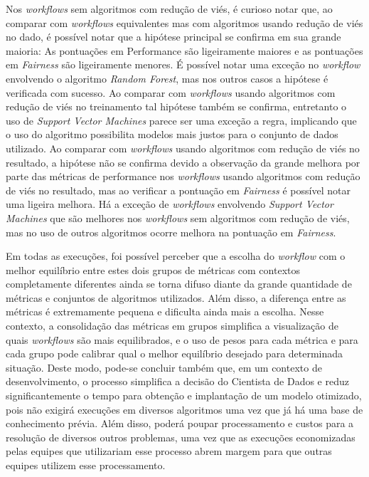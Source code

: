 \documentclass[twocolumn]{article}
\begin{document}
Nos \textit{workflows} sem algoritmos com redução de viés, é curioso notar que, ao comparar com \textit{workflows} equivalentes mas com algoritmos usando redução de viés no dado, é possível notar que a hipótese principal se confirma em sua grande maioria: As pontuações em Performance são ligeiramente maiores e as pontuações em \textit{Fairness} são ligeiramente menores. É possível notar uma exceção no \textit{workflow} envolvendo o algoritmo \textit{Random Forest}, mas nos outros casos a hipótese é verificada com sucesso. Ao comparar com \textit{workflows} usando algoritmos com redução de viés no treinamento tal hipótese também se confirma, entretanto o uso de \textit{Support Vector Machines} parece ser uma exceção a regra, implicando que o uso do algoritmo possibilita modelos mais justos para o conjunto de dados utilizado. Ao comparar com \textit{workflows} usando algoritmos com redução de viés no resultado, a hipótese não se confirma devido a observação da grande melhora por parte das métricas de performance nos \textit{workflows} usando algoritmos com redução de viés no resultado, mas ao verificar a pontuação em \textit{Fairness} é possível notar uma ligeira melhora. Há a exceção de \textit{workflows} envolvendo \textit{Support Vector Machines} que são melhores nos \textit{workflows} sem algoritmos com redução de viés, mas no uso de outros algoritmos ocorre melhora na pontuação em \textit{Fairness}.

Em todas as execuções, foi possível perceber que a escolha do \textit{workflow} com o melhor equilíbrio entre estes dois grupos de métricas com contextos completamente diferentes ainda se torna difuso diante da grande quantidade de métricas e conjuntos de algoritmos utilizados. Além disso, a diferença entre as métricas é extremamente pequena e dificulta ainda mais a escolha. Nesse contexto, a consolidação das métricas em grupos simplifica a visualização de quais \textit{workflows} são mais equilibrados, e o uso de pesos para cada métrica e para cada grupo pode calibrar qual o melhor equilíbrio desejado para determinada situação. Deste modo, pode-se concluir também que, em um contexto de desenvolvimento, o processo simplifica a decisão do Cientista de Dados e reduz significantemente o tempo para obtenção e implantação de um modelo otimizado, pois não exigirá execuções em diversos algoritmos uma vez que já há uma base de conhecimento prévia. Além disso, poderá poupar processamento e custos para a resolução de diversos outros problemas, uma vez que as execuções economizadas pelas equipes que utilizariam esse processo abrem margem para que outras equipes utilizem esse processamento.
\end{document}
